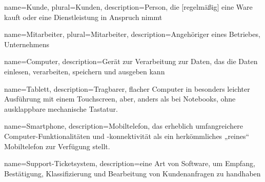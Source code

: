 \documentclass[parskip=full]{scrartcl}
\begin{document}
\newpage
\printglossaries
%
%

%
%

{
	name=Kunde,
	plural=Kunden,
	description={Person, die [regelmäßig] eine Ware kauft oder eine Dienstleistung in Anspruch nimmt}
}

{
	name=Mitarbeiter,
	plural=Mitarbeiter,
	description={Angehöriger eines Betriebes, Unternehmens}
}

{
	name=Computer,
	description={Gerät zur Verarbeitung zur Daten, das die Daten einlesen, verarbeiten, speichern und ausgeben kann}
}

{
	name=Tablett,
	description={Tragbarer, flacher Computer in besonders leichter Ausführung mit einem Touchscreen, aber, anders als bei Notebooks, ohne ausklappbare mechanische Tastatur.}
}

{
	name=Smartphone,
	description={Mobiltelefon, das erheblich umfangreichere Computer-Funktionalitäten und -konnektivität als ein herkömmliches „reines“ Mobiltelefon zur Verfügung stellt.}
}

{
	name=Support-Ticketsystem,
	description={eine Art von Software, um Empfang, Bestätigung, Klassifizierung und Bearbeitung von Kundenanfragen zu handhaben}
}
\end{document}
